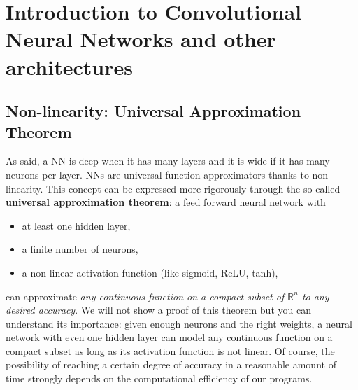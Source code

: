 \section{Introduction to Convolutional Neural Networks and other architectures}

\subsection{Non-linearity: Universal Approximation Theorem}\label{sec:non_linearity}
As said, a NN is deep when it has many layers and it is wide if it has many neurons per layer. NNs are universal function approximators thanks to non-linearity. This concept can be expressed more rigorously through the so-called \textbf{universal approximation theorem}: a feed forward neural network with
\begin{itemize}
    \item[-] at least one hidden layer,
    \item[-] a finite number of neurons,
    \item[-] a non-linear activation function (like sigmoid, ReLU, tanh),
\end{itemize}
can approximate \textit{any continuous function on a compact subset of $\mathbb{R}^{n}$ to \textit{any} desired accuracy}. We will not show a proof of this theorem but you can understand its importance: given enough neurons and the right weights, a neural network with even one hidden layer can model any continuous function on a compact subset as long as its activation function is not linear. Of course, the possibility of reaching a certain degree of accuracy in a reasonable amount of time strongly depends on the computational efficiency of our programs. 

